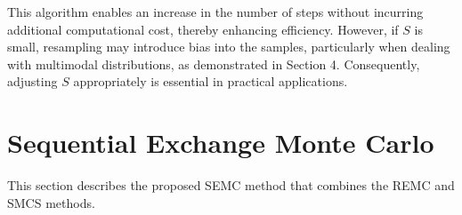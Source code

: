 \documentclass[12pt]{article}
\begin{document}
This algorithm enables an increase in the number of steps without incurring additional computational cost, thereby enhancing efficiency.
However, if $S$ is small, resampling may introduce bias into the samples, particularly when dealing with multimodal distributions, as demonstrated in Section 4.
Consequently, adjusting $S$ appropriately is essential in practical applications.

\section{Sequential Exchange Monte Carlo}
This section describes the proposed SEMC method that combines the REMC and SMCS methods.
\end{document}
